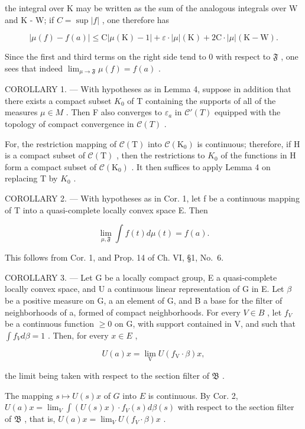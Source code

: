 the integral over K may be written as the sum of the analogous integrals over W and K - W; if \(C = \sup |f|\) , one therefore has

\[
| \mu (f) - f (a) | \leqslant \mathrm{C} | \mu (\mathrm{K}) - 1 | + \varepsilon \cdot | \mu | (\mathrm{K}) + 2 \mathrm{C} \cdot | \mu | (\mathrm{K} - \mathrm{W}).
\]

Since the first and third terms on the right side tend to 0 with respect to \(\mathfrak{F}\) , one sees that indeed \(\lim_{\mu \to \mathfrak{F}} \mu(f) = f(a)\) .

COROLLARY 1. --- With hypotheses as in Lemma 4, suppose in addition that there exists a compact subset \(K_{0}\) of T containing the supports of all of the measures \(\mu \in M\) . Then F also converges to \(\varepsilon_{a}\) in \(\mathcal{C}'(T)\) equipped with the topology of compact convergence in \(\mathcal{C}(T)\) .

For, the restriction mapping of \(\mathcal{C}(\mathrm{T})\) into \(\mathcal{C}(\mathrm{K}_{0})\) is continuous; therefore, if H is a compact subset of \(\mathcal{C}(\mathrm{T})\) , then the restrictions to \(K_{0}\) of the functions in H form a compact subset of \(\mathcal{C}(\mathrm{K}_{0})\) . It then suffices to apply Lemma 4 on replacing T by \(K_{0}\) .

COROLLARY 2. --- With hypotheses as in Cor. 1, let f be a continuous mapping of T into a quasi-complete locally convex space E. Then

\[
\lim _ {\mu , \mathfrak {F}} \int f (t) d \mu (t) = f (a).
\]

This follows from Cor. 1, and Prop. 14 of Ch. VI, §1, No.~6.

COROLLARY 3. --- Let G be a locally compact group, E a quasi-complete locally convex space, and U a continuous linear representation of G in E. Let \(\beta\) be a positive measure on G, a an element of G, and B a base for the filter of neighborhoods of a, formed of compact neighborhoods. For every \(V \in B\) , let \(f_{V}\) be a continuous function \(\geqslant 0\) on G, with support contained in V, and such that \(\int f_{V} d\beta = 1\) . Then, for every \(x \in E\) ,

\[
U (a) x = \lim _ {\mathrm{V}} U (f _ {\mathrm{V}} \cdot \beta) x,
\]

the limit being taken with respect to the section filter of \(\mathfrak{B}\) .

The mapping \(s \mapsto U(s)x\) of \(G\) into \(E\) is continuous. By Cor. 2, \(U(a)x = \lim_{V} \int (U(s)x) \cdot f_V(s) d\beta(s)\) with respect to the section filter of \(\mathfrak{B}\) , that is, \(U(a)x = \lim_{V} U(f_V \cdot \beta)x\) .

